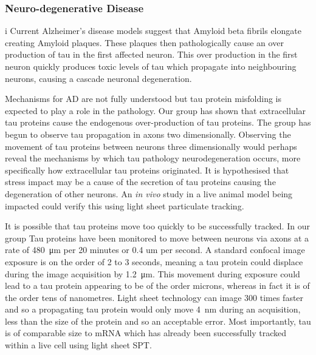 \subsubsection{Neuro-degenerative Disease}

i
Current Alzheimer's disease models suggest that Amyloid beta fibrils elongate creating Amyloid plaques.
These plaques then pathologically cause an over production of tau in the first affected neuron.
This over production in the first neuron quickly produces toxic levels of tau which propagate into neighbouring neurons, causing a cascade neuronal degeneration\cite{King2002}.

Mechanisms for AD are not fully understood but tau protein misfolding is expected to play a role in the pathology\cite{LaFerla2008}.
Our group has shown that extracellular tau proteins cause the endogenous over-production of tau proteins\cite{Michel2014a}.
The group has begun to observe tau propagation in axons two dimensionally.
Observing the movement of tau proteins between neurons three dimensionally would perhaps reveal the mechanisms by which tau pathology neurodegeneration occurs, more specifically how extracellular tau proteins originated.
It is hypothesised that stress impact may be a cause of the secretion of tau proteins causing the degeneration of other neurons\cite{Gavett2011,Patterson2014a}.
An \textit{in vivo} study in a live animal model being impacted could verify this using light sheet particulate tracking.

It is possible that tau proteins move too quickly to be successfully tracked.
In our group Tau proteins have been monitored to move between neurons via axons at a rate of \SI{480}{\micro\meter} per 20 minutes or 0.4 um per second.
A standard confocal image exposure is on the order of 2 to 3 seconds, meaning a tau protein could displace during the image acquisition by \SI{1.2}{\micro\meter}.
This movement during exposure could lead to a tau protein appearing to be of the order microns, whereas in fact it is of the order tens of nanometres.
Light sheet technology can image \SI{300}{} times faster and so a propagating tau protein would only move \SI{4}{\nano\meter} during an acquisition, less than the size of the protein and so an acceptable error.
Most importantly, tau is of comparable size to mRNA which has already been successfully tracked within a live cell using light sheet SPT\cite{Spille2015a}.

